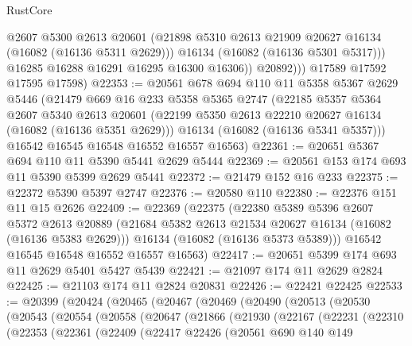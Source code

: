\begin{lexlean}{RustCore}
\begin{coremodule}
                  @2607
                  @5300
                  @2613
                  @20601
                  (@21898 @5310 @2613 @21909 @20627 @16134 (@16082 (@16136 @5311 @2629)))
                  @16134
                  (@16082 (@16136 @5301 @5317)))
                @16285
                @16288
                @16291
                @16295
                @16300
                @16306))
            @20892)))
      @17589
      @17592
      @17595
      @17598)
@22353 := @20561
    @678
    @694
    @110
    @11
    @5358
    @5367
    @2629
    @5446
    (@21479
      @669
      @16
      @233
      @5358
      @5365
      @2747
      (@22185
        @5357
        @5364
        @2607
        @5340
        @2613
        @20601
        (@22199 @5350 @2613 @22210 @20627 @16134 (@16082 (@16136 @5351 @2629)))
        @16134
        (@16082 (@16136 @5341 @5357)))
      @16542
      @16545
      @16548
      @16552
      @16557
      @16563)
@22361 := @20651 @5367 @694 @110 @11 @5390 @5441 @2629 @5444
@22369 := @20561 @153 @174 @693 @11 @5390 @5399 @2629 @5441
@22372 := @21479 @152 @16 @233
@22375 := @22372 @5390 @5397 @2747
@22376 := @20580 @110
@22380 := @22376 @151 @11 @15 @2626
@22409 := @22369
    (@22375
      (@22380
        @5389
        @5396
        @2607
        @5372
        @2613
        @20889
        (@21684 @5382 @2613 @21534 @20627 @16134 (@16082 (@16136 @5383 @2629)))
        @16134
        (@16082 (@16136 @5373 @5389)))
      @16542
      @16545
      @16548
      @16552
      @16557
      @16563)
@22417 := @20651 @5399 @174 @693 @11 @2629 @5401 @5427 @5439
@22421 := @21097 @174 @11 @2629 @2824
@22425 := @21103 @174 @11 @2824 @20831
@22426 := @22421 @22425
@22533 := @20399
    (@20424
      (@20465
        (@20467
          (@20469
            (@20490
              (@20513
                (@20530
                  (@20543
                    (@20554
                      (@20558
                        (@20647
                          (@21866
                            (@21930
                              (@22167
                                (@22231
                                  (@22310
                                    (@22353
                                      (@22361
                                        (@22409
                                          (@22417
                                            @22426
                                            (@20561
                                              @690
                                              @140
                                              @149

\end{coremodule}
\end{lexlean}
